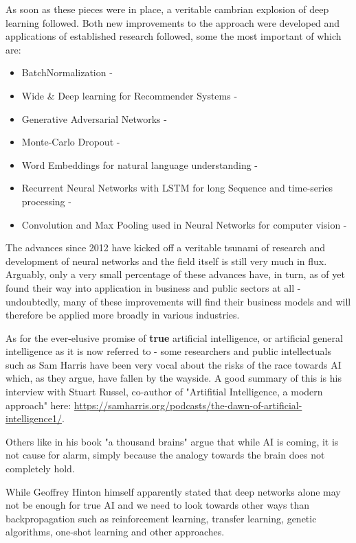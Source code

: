 As soon as these pieces were in place, a veritable cambrian explosion of deep learning followed. Both new improvements to the approach were developed and applications of established research followed, some the most important of which are:

\begin{itemize}
	\item BatchNormalization - \cite{ioffe2015batch}
	\item Wide \& Deep learning for Recommender Systems - \cite{cheng2016wide}
	\item Generative Adversarial Networks - \cite{goodfellow2014generative}
	\item Monte-Carlo Dropout - \cite{gal2016dropout}
	\item Word Embeddings for natural language understanding - \cite{mikolov2013distributed}
	\item Recurrent Neural Networks with \ac{LSTM} for long Sequence and time-series processing - \cite{hochreiter1997long}
	\item Convolution and Max Pooling used in Neural Networks for computer vision - \cite{378228}
\end{itemize}

The advances since 2012 have kicked off a veritable tsunami of research and development of neural networks and the field itself is still very much in flux. Arguably, only a very small percentage of these advances have, in turn, as of yet found their way into application in business and public sectors at all - undoubtedly, many of these improvements will find their business models and will therefore be applied more broadly in various industries.

As for the ever-elusive promise of \textbf{true} artificial intelligence, or artificial general intelligence as it is now referred to - some researchers and public intellectuals such as Sam Harris have been very vocal about the risks of the race towards \ac{AI} which, as they argue, have fallen by the wayside. A good summary of this is his interview with Stuart Russel, co-author of "Artifitial Intelligence, a modern approach" here: \url{https://samharris.org/podcasts/the-dawn-of-artificial-intelligence1/}. 

Others like \cite{thousand} in his book "a thousand brains" argue that while \ac{AI} is coming, it is not cause for alarm, simply because the analogy towards the brain does not completely hold. 

While Geoffrey Hinton himself apparently stated that deep networks alone may not be enough for true \ac{AI} and we need to look towards other ways than backpropagation such as reinforcement learning, transfer learning, genetic algorithms, one-shot learning and other approaches.

